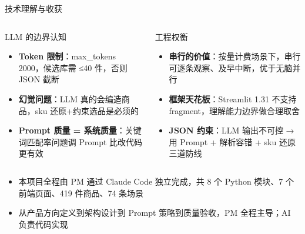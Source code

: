 \documentclass[aspectratio=169, UTF8]{ctexbeamer}
\begin{document}
\begin{frame}{技术理解与收获}
  \begin{columns}[T]
    \begin{block}{LLM 的边界认知}
      \begin{itemize}
        \item \textbf{Token 限制}：max\_tokens 2000，候选库需 ≤40 件，否则 JSON 截断
        \item \textbf{幻觉问题}：LLM 真的会编造商品，sku 还原+约束选品是必须的
        \item \textbf{Prompt 质量 = 系统质量}：关键词匹配率问题调 Prompt 比改代码更有效
      \end{itemize}
    \end{block}
    \begin{block}{工程权衡}
      \begin{itemize}
        \item \textbf{串行的价值}：按量计费场景下，串行可逐条观察、及早中断，优于无脑并行
        \item \textbf{框架天花板}：Streamlit 1.31 不支持 fragment，理解能力边界做合理取舍
        \item \textbf{JSON 约束}：LLM 输出不可控 → 用 Prompt + 解析容错 + sku 还原三道防线
      \end{itemize}
    \end{block}
  \end{columns}

  \vspace{0.6em}
  \begin{center}
  \end{center}

  \vspace{0.3em}
  \begin{itemize}
    \item 本项目全程由 PM 通过 Claude Code 独立完成，共 8 个 Python 模块、7 个前端页面、419 件商品、74 条场景
    \item 从产品方向定义到架构设计到 Prompt 策略到质量验收，PM 全程主导；AI 负责代码实现
  \end{itemize}
\end{frame}
\end{document}
